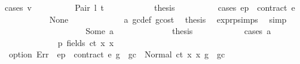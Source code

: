 \begin{isabellebody}
\ {\isacharparenleft}{\kern0pt}cases\ v{}{\isacharparenright}{\kern0pt}\isanewline
\ \ \ \ \ \ \ \ \isamarkupfalse%
\ {\isacharparenleft}{\kern0pt}Pair\ l{}\ t{}{\isacharparenright}{\kern0pt}\isanewline
\ \ \ \ \ \ \ \ \isamarkupfalse%
\ \isamarkupfalse%
\ {\isacharquery}{\kern0pt}thesis\isanewline
\ \ \ \ \ \ \ \ \isamarkupfalse%
\ {\isacharparenleft}{\kern0pt}cases\ {\isachardoublequoteopen}ep\ {\isachardollar}{\kern0pt}{\isachardollar}{\kern0pt}\ contract\ e{\isachardoublequoteclose}{\isacharparenright}{\kern0pt}\isanewline
\ \ \ \ \ \ \ \ \ \ \isamarkupfalse%
\ None\isanewline
\ \ \ \ \ \ \ \ \ \ \isamarkupfalse%
\ {}{}{\isacharparenleft}{\kern0pt}{}{\isacharparenright}{\kern0pt}\ a{}\ gc{\isacharunderscore}{\kern0pt}def\ gcost\ \isamarkupfalse%
\ {\isacharquery}{\kern0pt}thesis\ \isamarkupfalse%
\ expr{\isachardot}{\kern0pt}psimps{\isacharparenleft}{\kern0pt}{}{}{\isacharparenright}{\kern0pt}\ \isamarkupfalse%
\ simp\isanewline
\ \ \ \ \ \ \ \ \isamarkupfalse%
\isanewline
\ \ \ \ \ \ \ \ \ \ \isamarkupfalse%
\ {\isacharparenleft}{\kern0pt}Some\ a{\isacharparenright}{\kern0pt}\isanewline
\ \ \ \ \ \ \ \ \ \ \isamarkupfalse%
\ \isamarkupfalse%
\ {\isacharquery}{\kern0pt}thesis\isanewline
\ \ \ \ \ \ \ \ \ \ \isamarkupfalse%
\ {\isacharparenleft}{\kern0pt}cases\ a{\isacharparenright}{\kern0pt}\isanewline
\ \ \ \ \ \ \ \ \ \ \ \ \isamarkupfalse%
\ p{}{\isacharcolon}{\kern0pt}\ {\isacharparenleft}{\kern0pt}fields\ ct\ x{}\ x{}{\isacharparenright}{\kern0pt}\isanewline
\ \ \ \ \ \ \ \ \ \ \ \ \isamarkupfalse%
\ \isamarkupfalse%
\ {}{\isacharcolon}{\kern0pt}\ {\isachardoublequoteopen}option\ Err\ {\isacharparenleft}{\kern0pt}{\isasymlambda}{\isacharunderscore}{\kern0pt}{\isachardot}{\kern0pt}\ ep\ {\isachardollar}{\kern0pt}{\isachardollar}{\kern0pt}\ contract\ e{\isacharparenright}{\kern0pt}\ {\isacharparenleft}{\kern0pt}g\ {\isacharminus}{\kern0pt}\ gc{\isacharparenright}{\kern0pt}\ {\isacharequal}{\kern0pt}\ Normal\ {\isacharparenleft}{\kern0pt}{\isacharparenleft}{\kern0pt}ct{\isacharcomma}{\kern0pt}\ x{}{\isacharcomma}{\kern0pt}\ x{}{\isacharparenright}{\kern0pt}{\isacharcomma}{\kern0pt}\ {\isacharparenleft}{\kern0pt}g\ {\isacharminus}{\kern0pt}\ gc{\isacharparenright}{\kern0pt}{\isacharparenright}{\kern0pt}{\isachardoublequoteclose}\ \isamarkupfalse%

\end{isabellebody}
